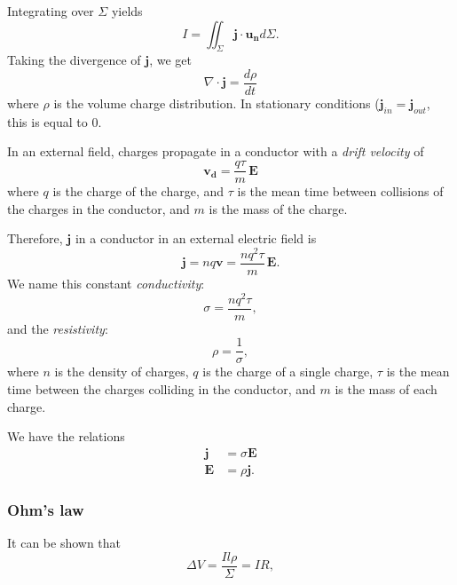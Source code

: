 \documentclass[a4paper, 12pt]{article}
\renewcommand{\vec}[1]{\mathbf{#1}}
\newcommand{\E}{\ensuremath{\vec{E}}}
\renewcommand{\j}{\ensuremath{\vec{j}}}
\begin{document}
        Integrating over $\Sigma$ yields
        \begin{equation}
            I = \iint_\Sigma \j\cdot\vec{u_n}d\Sigma.
        \end{equation}
        Taking the divergence of $\j$, we get
        \begin{equation}
            \nabla \cdot \j = \frac{d\rho}{dt}
        \end{equation}
        where $\rho$ is the volume charge distribution.
        In stationary conditions ($\j_{in} = \j_{out}$, this is equal to 0. 
    
        In an external field, charges propagate in a conductor with a \textit{drift velocity} of
        \begin{equation}
            \vec{v_d} = \frac{q\tau}{m}\,\E
        \end{equation}
        where $q$ is the charge of the charge, and $\tau$ is the mean time between collisions of the charges in the conductor, 
        and $m$ is the mass of the charge.
        
        Therefore, $\j$ in a conductor in an external electric field is
        \begin{equation}
            \j = nq\vec{v} = \frac{nq^2\tau}{m}\,\E.
        \end{equation}
        We name this constant \textit{conductivity}: 
        \begin{equation}
            \sigma = \frac{nq^2\tau}{m},
        \end{equation}
        and the \textit{resistivity}:
        \begin{equation}
            \rho = \frac{1}{\sigma},
        \end{equation}
        where $n$ is the density of charges, $q$ is the charge of a single charge, 
        $\tau$ is the mean time between the charges colliding in the conductor, and $m$ is the mass of each charge. 
        
        We have the relations 
        \begin{align}
            \j &= \sigma \E \\
            \E &= \rho \j.
        \end{align}

    \subsubsection{Ohm's law}
        It can be shown that 
        \begin{equation}
            \Delta V = \frac{Il\rho}{\Sigma} = IR,
        \end{equation}
    
\end{document}
